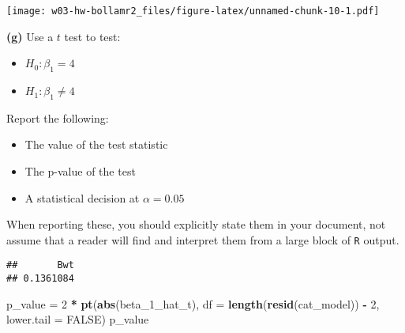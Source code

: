 \documentclass[
]{article}
\newenvironment{Shaded}{\begin{snugshade}}{\end{snugshade}}
\newcommand{\DataTypeTok}[1]{\textcolor[rgb]{0.13,0.29,0.53}{#1}}
\newcommand{\DecValTok}[1]{\textcolor[rgb]{0.00,0.00,0.81}{#1}}
\newcommand{\KeywordTok}[1]{\textcolor[rgb]{0.13,0.29,0.53}{\textbf{#1}}}
\newcommand{\NormalTok}[1]{#1}
\newcommand{\OperatorTok}[1]{\textcolor[rgb]{0.81,0.36,0.00}{\textbf{#1}}}
\newcommand{\OtherTok}[1]{\textcolor[rgb]{0.56,0.35,0.01}{#1}}
\newcommand{\StringTok}[1]{\textcolor[rgb]{0.31,0.60,0.02}{#1}}
\providecommand{\tightlist}{%
  \setlength{\itemsep}{0pt}\setlength{\parskip}{0pt}}
\begin{document}
\texttt{[image: w03-hw-bollamr2\_files/figure-latex/unnamed-chunk-10-1.pdf]}

\textbf{(g)} Use a \(t\) test to test:

\begin{itemize}
\tightlist
\item
  \(H_0: \beta_1 = 4\)
\item
  \(H_1: \beta_1 \neq 4\)
\end{itemize}

Report the following:

\begin{itemize}
\tightlist
\item
  The value of the test statistic
\item
  The p-value of the test
\item
  A statistical decision at \(\alpha = 0.05\)
\end{itemize}

When reporting these, you should explicitly state them in your document,
not assume that a reader will find and interpret them from a large block
of \texttt{R} output.

\begin{Shaded}
\end{Shaded}

\begin{verbatim}
##       Bwt 
## 0.1361084
\end{verbatim}

\begin{Shaded}
\begin{Highlighting}[]
\NormalTok{p_value =}\StringTok{ }\DecValTok{2} \OperatorTok{*}\StringTok{ }\KeywordTok{pt}\NormalTok{(}\KeywordTok{abs}\NormalTok{(beta_}\DecValTok{1}\NormalTok{_hat_t), }\DataTypeTok{df =} \KeywordTok{length}\NormalTok{(}\KeywordTok{resid}\NormalTok{(cat_model)) }\OperatorTok{-}\StringTok{ }\DecValTok{2}\NormalTok{, }\DataTypeTok{lower.tail =} \OtherTok{FALSE}\NormalTok{)}
\NormalTok{p_value}
\end{Highlighting}
\end{Shaded}
\end{document}
